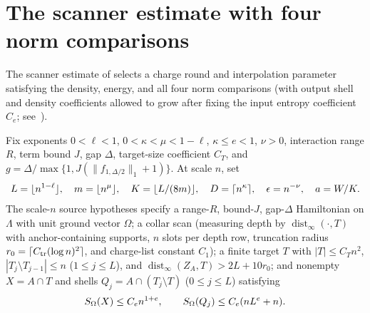 \section{The scanner estimate with four norm comparisons}
\label{sec:al_scanner_source}

The scanner estimate of \cite[Proposition~9.2]{OpenAI2026AreaLaw} selects a charge round and interpolation parameter satisfying the density, energy, and all four norm comparisons (with output shell and density coefficients allowed to grow after fixing the input entropy coefficient $C_e$; see~\cite{gap:arealaw2d_scanner_inputs}).

\begin{definition}
    \label{def:al_scanner_source_statement}
    \leanok
    Fix exponents $0<\ell<1$, $0<\kappa<\mu<1-\ell$, $\kappa\le e<1$, $\nu>0$, interaction range $R$, term bound $J$, gap $\Delta$, target-size coefficient $C_T$, and $g=\Delta/\max\{1,J(\|f_{1,\Delta/2}\|_1+1)\}$.
    At scale $n$, set
    \begin{align}
        L =\lfloor n^{1-\ell}\rfloor,\quad
        m =\lfloor n^\mu\rfloor,\quad
        K =\lfloor L/(8m)\rfloor,\quad
        D =\lceil n^\kappa\rceil,\quad
        \epsilon =n^{-\nu},\quad
        a =W/K.\notag
    \end{align}
    The scale-$n$ source hypotheses specify a range-$R$, bound-$J$, gap-$\Delta$ Hamiltonian on $\Lambda$ with unit ground vector $\Omega$; a collar scan (measuring depth by $\operatorname{dist}_\infty(\cdot,T)$ with anchor-containing supports, $n$ slots per depth row, truncation radius $r_0=\lceil C_{\rm tr}(\log n)^2\rceil$, and charge-list constant $C_1$); a finite target $T$ with $|T|\le C_Tn^2$, $|T_j\setminus T_{j-1}|\le n$ ($1\le j\le L$), and $\operatorname{dist}_\infty(Z_A,T)>2L+10r_0$; and nonempty $X=A\cap T$ and shells $Q_j=A\cap(T_j\setminus T)$ ($0\le j\le L$) satisfying
    \begin{align}
        S_\Omega(X)   \le C_en^{1+e},\qquad
        S_\Omega(Q_j) \le C_e(nL^e+n).\notag
    \end{align}


\end{definition}
